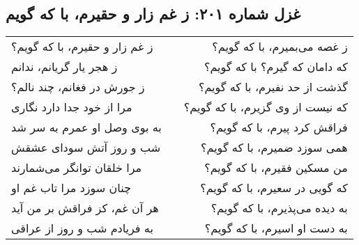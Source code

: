 \begin{center}
\section*{غزل شماره ۲۰۱: ز غم زار و حقیرم، با که گویم}
\label{sec:201}
\begin{longtable}{l p{0.5cm} r}
ز غم زار و حقیرم، با که گویم؟
&&
ز غصه می‌بمیرم، با که گویم؟
\\
ز هجر یار گریانم، ندانم
&&
که دامان که گیرم؟ با که گویم؟
\\
ز جورش در فغانم، چند نالم؟
&&
گذشت از حد نفیرم، با که گویم؟
\\
مرا از خود جدا دارد نگاری
&&
که نیست از وی گزیرم، با که گویم؟
\\
به بوی وصل او عمرم به سر شد
&&
فراقش کرد پیرم، با که گویم؟
\\
شب و روز آتش سودای عشقش
&&
همی سوزد ضمیرم، با که گویم؟
\\
مرا خلقان توانگر می‌شمارند
&&
من مسکین فقیرم، با که گویم؟
\\
چنان سوزد مرا تاب غم او
&&
که گویی در سعیرم، با که گویم؟
\\
هر آن غم، کز فراقش بر من آید
&&
به دیده می‌پذیرم، با که گویم؟
\\
به فریادم شب و روز از عراقی
&&
به دست او اسیرم، با که گویم؟
\\
\end{longtable}
\end{center}
